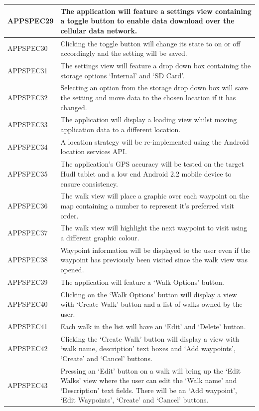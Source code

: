 \documentclass[11pt,a4paper]{article}
\begin{document}
\begin{longtable}{|p{2.5cm}p{13cm}|}
APPSPEC29 & The application will feature a settings view containing a toggle button to enable data download over the cellular data network. \\ \hline
APPSPEC30 & Clicking the toggle button will change its state to on or off accordingly and the setting will be saved. \\ \hline
APPSPEC31 & The settings view will feature a drop down box containing the storage options `Internal' and `SD Card'. \\ \hline
APPSPEC32 & Selecting an option from the storage drop down box will save the setting and move data to the chosen location if it has changed. \\ \hline
APPSPEC33 & The application will display a loading view whilst moving application data to a different location. \\ \hline
APPSPEC34 & A location strategy will be re-implemented using the Android location services API. \\ \hline
APPSPEC35 & The application's GPS accuracy will be tested on the target Hudl tablet and a low end Android 2.2 mobile device to ensure consistency. \\ \hline
APPSPEC36 & The walk view will place a graphic over each waypoint on the map containing a number to represent it's preferred visit order. \\ \hline
APPSPEC37 & The walk view will highlight the next waypoint to visit using a different graphic colour. \\ \hline
APPSPEC38 & Waypoint information will be displayed to the user even if the waypoint has previously been visited since the walk view was opened. \\ \hline
APPSPEC39 & The application will feature a `Walk Options' button.\\ \hline
APPSPEC40 & Clicking on the `Walk Options' button will display a view with `Create Walk' button and a list of walks owned by the user. \\ \hline
APPSPEC41 & Each walk in the list will have an `Edit' and `Delete' button.\\ \hline
APPSPEC42 & Clicking the `Create Walk' button will display a view with `walk name, description' text boxes and `Add waypoints', `Create' and `Cancel' buttons.\\ \hline
APPSPEC43 & Pressing an `Edit' button on a walk will bring up the `Edit Walks' view where the user can edit the `Walk name' and `Description' text fields. There will be an `Add waypoint', `Edit Waypoints', `Create' and `Cancel' buttons. \\ \hline

\end{longtable}
\end{document}
